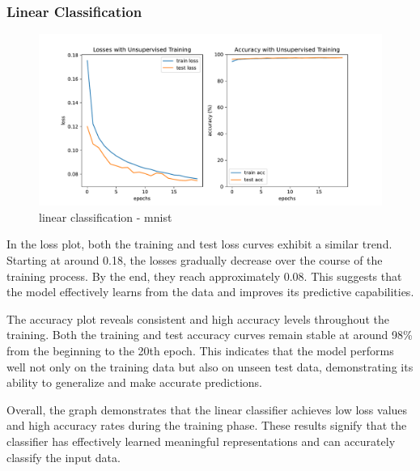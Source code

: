 \documentclass{midl} %
\begin{document}
\subsubsection{Linear Classification}
\begin{figure}[H]
  \centering
  \includegraphics[width=1.2\textwidth]{linear_classif_mnist.pdf}
  \caption{linear classification - mnist}
  \label{fig:linear classification - mnist}
\end{figure}
In the loss plot, both the training and test loss curves exhibit a similar trend. Starting at around 0.18, the losses gradually decrease over the course of the training process. By the end, they reach approximately 0.08. This suggests that the model effectively learns from the data and improves its predictive capabilities.

The accuracy plot reveals consistent and high accuracy levels throughout the training. Both the training and test accuracy curves remain stable at around 98\% from the beginning to the 20th epoch. This indicates that the model performs well not only on the training data but also on unseen test data, demonstrating its ability to generalize and make accurate predictions.

Overall, the graph demonstrates that the linear classifier achieves low loss values and high accuracy rates during the training phase. These results signify that the classifier has effectively learned meaningful representations and can accurately classify the input data.
\end{document}
